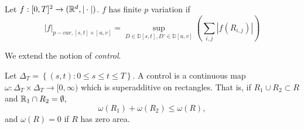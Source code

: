 \begin{definition}
    Let $f:[0,T]^2 \rightarrow (\mathbb{R}^d, | \cdot |)$.
    $f$ has finite $p$ variation if 
    \begin{equation}
        |f|_{p-var,[s,t] \times [u,v]} = \sup_{D \in \mathbb{D}[s,t], D' \in \mathbb{D}[u,v]} \left( \sum_{i,j} \left| f(R_{i,j}) \right| \right)
    \end{equation}
\end{definition}

We extend the notion of \textit{control}.

\begin{definition}[2D control]
    Let $\Delta_T = \left\{ (s,t): 0 \leq s \leq t \leq T \right\}$. 
    A control is a continuous map $\omega: \Delta_T \times  \Delta_T \rightarrow [0,\infty)$ which is superadditive on rectangles.
    That is, if $R_1 \cup R_2 \subset R$ and $\mathbb{R}_1 \cap R_2 = \emptyset,$
    \begin{equation}
        \omega(R_1) + \omega(R_2) \le \omega(R),
    \end{equation}
    and $\omega(R)=0$ if $R$ has zero area.
\end{definition}

